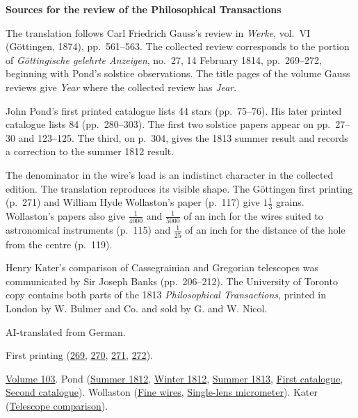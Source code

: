 \clearpage\thispagestyle{empty}
\begin{center}\Large\bfseries Sources for the review of the Philosophical Transactions\end{center}

The translation follows Carl Friedrich Gauss’s review in \emph{Werke}, vol.~VI (Göttingen, 1874), pp.~561--563. The collected review corresponds to the portion of \emph{Göttingische gelehrte Anzeigen}, no.~27, 14 February 1814, pp.~269--272, beginning with Pond’s solstice observations. The title pages of the volume Gauss reviews give \emph{Year} where the collected review has \emph{Jear}.

John Pond’s first printed catalogue lists 44 stars (pp.~75--76). His later printed catalogue lists 84 (pp.~280--303). The first two solstice papers appear on pp.~27--30 and 123--125. The third, on p.~304, gives the 1813 summer result and records a correction to the summer 1812 result.

The denominator in the wire’s load is an indistinct character in the collected edition. The translation reproduces its visible shape. The Göttingen first printing (p.~271) and William Hyde Wollaston’s paper (p.~117) give $1\frac{1}{3}$ grains. Wollaston’s papers also give $\frac{1}{4000}$ and $\frac{1}{5000}$ of an inch for the wires suited to astronomical instruments (p.~115) and $\frac{1}{25}$ of an inch for the distance of the hole from the centre (p.~119).

Henry Kater’s comparison of Cassegrainian and Gregorian telescopes was communicated by Sir Joseph Banks (pp.~206--212). The University of Toronto copy contains both parts of the 1813 \emph{Philosophical Transactions}, printed in London by W. Bulmer and Co. and sold by G. and W. Nicol.

AI-translated from German.

First printing (\href{https://images.p.sub.uni-goettingen.de/iiif/image/gdz:PPN319721507_1814:00000271/full/1650,/0/default.jpg}{269}, \href{https://images.p.sub.uni-goettingen.de/iiif/image/gdz:PPN319721507_1814:00000272/full/1650,/0/default.jpg}{270}, \href{https://images.p.sub.uni-goettingen.de/iiif/image/gdz:PPN319721507_1814:00000273/full/1650,/0/default.jpg}{271}, \href{https://images.p.sub.uni-goettingen.de/iiif/image/gdz:PPN319721507_1814:00000274/full/1650,/0/default.jpg}{272}).

\href{https://archive.org/details/philosophicaltra103royauoft}{Volume 103}.
Pond (\href{https://doi.org/10.1098/rstl.1813.0006}{Summer 1812}, \href{https://doi.org/10.1098/rstl.1813.0020}{Winter 1812}, \href{https://upload.wikimedia.org/wikipedia/commons/e/ed/Philosophical_transactions._v._1-177%2C_1665-66-1886_%28IA_philosophicaltra103royauoft%29.pdf#page=364}{Summer 1813}, \href{https://doi.org/10.1098/rstl.1813.0011}{First catalogue}, \href{https://doi.org/10.1098/rstl.1813.0035}{Second catalogue}).
Wollaston (\href{https://doi.org/10.1098/rstl.1813.0018}{Fine wires}, \href{https://doi.org/10.1098/rstl.1813.0019}{Single-lens micrometer}).
Kater (\href{https://doi.org/10.1098/rstl.1813.0028}{Telescope comparison}).

\clearpage
